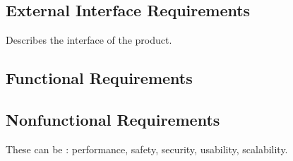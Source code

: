 \subsection{External Interface Requirements}

\begin{content}
Describes the interface of the product.
\end{content}

\subsection{Functional Requirements}


\subsection{Nonfunctional Requirements}

\begin{content}
These can be : performance, safety, security, usability, scalability.
\end{content}

\newpage
